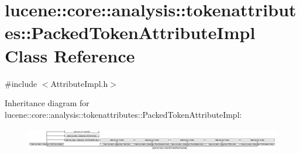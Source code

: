 \hypertarget{classlucene_1_1core_1_1analysis_1_1tokenattributes_1_1PackedTokenAttributeImpl}{}\section{lucene\+:\+:core\+:\+:analysis\+:\+:tokenattributes\+:\+:Packed\+Token\+Attribute\+Impl Class Reference}
\label{classlucene_1_1core_1_1analysis_1_1tokenattributes_1_1PackedTokenAttributeImpl}


{\ttfamily \#include $<$Attribute\+Impl.\+h$>$}

Inheritance diagram for lucene\+:\+:core\+:\+:analysis\+:\+:tokenattributes\+:\+:Packed\+Token\+Attribute\+Impl\+:\begin{figure}[H]
\begin{center}
\leavevmode
\includegraphics[height=1.049869cm]{classlucene_1_1core_1_1analysis_1_1tokenattributes_1_1PackedTokenAttributeImpl}
\end{center}
\end{figure}
